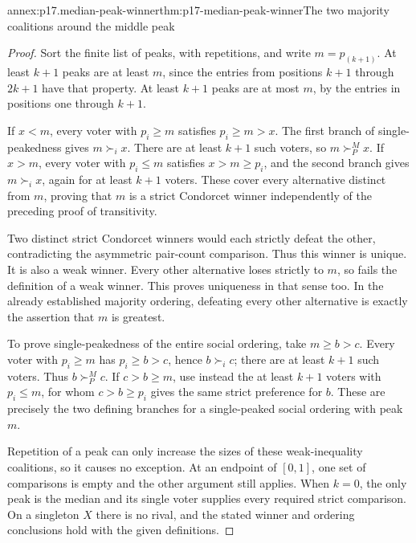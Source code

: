 \begin{annexitem}{annex:p17.median-peak-winner}{thm:p17-median-peak-winner}{The two majority coalitions around the middle peak}
\begin{proof}
Sort the finite list of peaks, with repetitions, and write
\(m=p_{(k+1)}\). At least \(k+1\) peaks are at least \(m\),
since the entries from positions \(k+1\) through \(2k+1\)
have that property. At least \(k+1\) peaks are at most \(m\),
by the entries in positions one through \(k+1\).

If \(x<m\), every voter with \(p_i\geq m\) satisfies
\(p_i\geq m>x\). The first branch of single-peakedness gives
\(m\succ_i x\). There are at least \(k+1\) such voters, so
\(m\succ^M_P x\). If \(x>m\), every voter with
\(p_i\leq m\) satisfies \(x>m\geq p_i\), and the second
branch gives \(m\succ_i x\), again for at least \(k+1\)
voters. These cover every alternative distinct from \(m\), proving
that \(m\) is a strict Condorcet winner independently of the
preceding proof of transitivity.

Two distinct strict Condorcet winners would each strictly defeat the
other, contradicting the asymmetric pair-count comparison. Thus this
winner is unique. It is also a weak winner. Every other alternative
loses strictly to \(m\), so fails the definition of a weak winner.
This proves uniqueness in that sense too. In the already established
majority ordering, defeating every other alternative is exactly the
assertion that \(m\) is greatest.

To prove single-peakedness of the entire social ordering, take
\(m\geq b>c\). Every voter with \(p_i\geq m\) has
\(p_i\geq b>c\), hence \(b\succ_i c\); there are at least
\(k+1\) such voters. Thus \(b\succ^M_P c\). If
\(c>b\geq m\), use instead the at least \(k+1\) voters with
\(p_i\leq m\), for whom \(c>b\geq p_i\) gives the same
strict preference for \(b\). These are precisely the two defining
branches for a single-peaked social ordering with peak \(m\).

Repetition of a peak can only increase the sizes of these weak-inequality
coalitions, so it causes no exception. At an endpoint of \([0,1]\),
one set of comparisons is empty and the other argument still applies.
When \(k=0\), the only peak is the median and its single voter
supplies every required strict comparison. On a singleton \(X\)
there is no rival, and the stated winner and ordering conclusions
hold with the given definitions.
\end{proof}
\end{annexitem}

